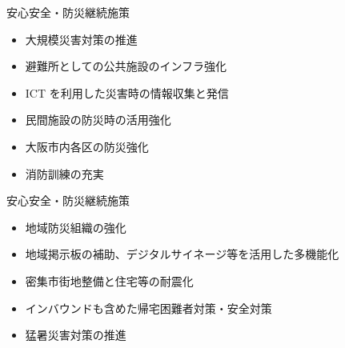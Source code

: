 \documentclass[dvipdfmx]{beamer}
\begin{document}
    \begin{frame}{安心安全・防災}{継続施策}
        \begin{small}
            \begin{itemize}
                \setlength{\itemsep}{2mm}
                \item 大規模災害対策の推進
                \item 避難所としての公共施設のインフラ強化
                \item ICT を利用した災害時の情報収集と発信
                \item 民間施設の防災時の活用強化
                \item 大阪市内各区の防災強化
                \item 消防訓練の充実
            \end{itemize}
        \end{small}
    \end{frame}

    \begin{frame}{安心安全・防災}{継続施策}
        \begin{small}
            \begin{itemize}
                \setlength{\itemsep}{2mm}
                \item 地域防災組織の強化
                \item 地域掲示板の補助、デジタルサイネージ等を活用した多機能化
                \item 密集市街地整備と住宅等の耐震化
                \item インバウンドも含めた帰宅困難者対策・安全対策
                \item 猛暑災害対策の推進
            \end{itemize}
        \end{small}
    \end{frame}
\end{document}
